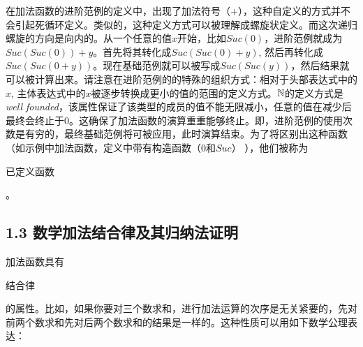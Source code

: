 \documentclass[twocolumn]{article}
\begin{document}
\begin{CJK}{UTF8}{gbsn}
\indent \indent 在加法函数的进阶范例的定义中，出现了加法符号（+），这种自定义的方式并不会引起死循环定义。类似的，这种定义方式可以被理解成螺旋状定义。而这次递归螺旋的方向是向内的。从一个任意的值$x$开始，比如$Suc(0)$，进阶范例就成为$Suc(Suc(0)) + y$。首先将其转化成$Suc(Suc(0) + y)$, 然后再转化成$Suc(Suc(0 + y))$。现在基础范例就可以被写成$Suc(Suc(y))$，然后结果就可以被计算出来。请注意在进阶范例的的特殊的组织方式：相对于头部表达式中的$x$, 主体表达式中的$x$被逐步转换成更小的值的范围的定义方式。$\mathbb{N}$的定义方式是{\em well founded}，该属性保证了该类型的成员的值不能无限减小，任意的值在减少后最终会终止于$0$。这确保了加法函数的演算重重能够终止。即，进阶范例的使用次数是有穷的，最终基础范例将可被应用，此时演算结束。为了将区别出这种函数（如示例中加法函数，定义中带有构造函数（$0$和$Suc$） ），他们被称为\begin{CJK}{UTF8}{gkai}已定义函数\end{CJK}。


\subsection*{1.3 数学加法结合律及其归纳法证明}
\label{assoc-proof}

\indent \indent \indent 加法函数具有\begin{CJK}{UTF8}{gkai}结合律\end{CJK}的属性。比如，如果你要对三个数求和，进行加法运算的次序是无关紧要的，先对前两个数求和先对后两个数求和的结果是一样的。这种性质可以用如下数学公理表达：


\end{CJK}
\end{document}

